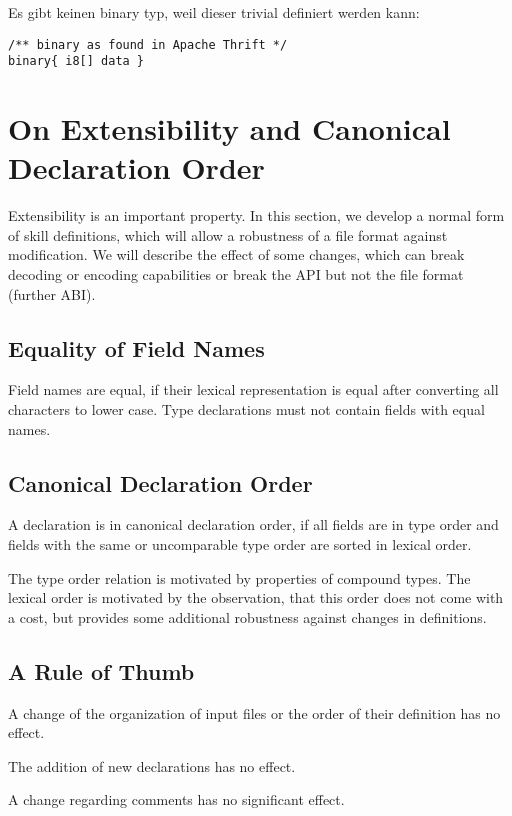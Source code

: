 \documentclass[a4paper,10pt]{article}
\begin{document}
Es gibt keinen binary typ, weil dieser trivial definiert werden kann:
\begin{verbatim}
/** binary as found in Apache Thrift */
binary{ i8[] data }
\end{verbatim}


\section{On Extensibility and Canonical Declaration Order}

Extensibility is an important property. In this section, we develop a normal form of skill definitions, which will allow a robustness of a file format against modification. We will describe the effect of some changes, which can break decoding or encoding capabilities or break the API but not the file format (further ABI).

\subsection{Equality of Field Names}

Field names are equal, if their lexical representation is equal after converting all characters to lower case. Type declarations must not contain fields with equal names.

\subsection{Canonical Declaration Order}

A declaration is in canonical declaration order, if all fields are in type order and fields with the same or uncomparable type order are sorted in lexical order.

The type order relation is motivated by properties of compound types. The lexical order is motivated by the observation, that this order does not come with a cost, but provides some additional robustness against changes in definitions.

\subsection{A Rule of Thumb}

A change of the organization of input files or the order of their definition has no effect.

The addition of new declarations has no effect.

A change regarding comments has no significant effect.
\end{document}
